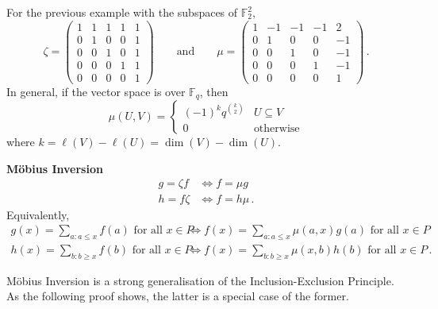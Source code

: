 \documentclass[a4paper]{article}
\newcommand{\example} {\bigskip\noindent{\bf Example.}\;\;}
\newenvironment{thm}[1]{
	\begin{framed}
	\noindent
	{\bfseries #1}\\}{\setlength{\itemsep}{0pt}
	\end{framed}
}
\newcommand{\FF}{\mathbb{F}}
\begin{document}
\newpage
\example
For the previous example with the subspaces of $\FF_2^2$,
	\[
      \zeta = \begin{pmatrix}
		1&1&1&1&1\\0&1&0&0&1\\0&0&1&0&1\\0&0&0&1&1\\0&0&0&0&1
	\end{pmatrix}\qquad\text{and}\qquad
      \mu = \begin{pmatrix}
		1&-1&-1&-1&2\\0&1&0&0&-1\\0&0&1&0&-1\\0&0&0&1&-1\\0&0&0&0&1
	\end{pmatrix}\,.\]
In general, if the vector space is over $\FF_q$, then
	\[ \mu(U,V) = \begin{cases}
		(-1)^k q^{\binom{k}{2}} & U \subseteq V\\
		0  & \text{otherwise}
	\end{cases}\]
where $k = \ell(V) - \ell(U) = \dim(V) - \dim(U)$.


\begin{thm}{M\"obius Inversion}
\begin{align*}
	g = \zeta f & \iff f = \mu g\\
	h = f\zeta  & \iff f = h\mu\,.
\end{align*}
Equivalently,
\begin{align*}
	g(x) = \sum_{a : a \leq x} f(a) \text{ for all } x \in P & \iff f(x)
         = \sum_{a : a \leq x} \mu (a,x) g(a) \text{ for all } x \in P\\
	h(x) = \sum_{b : b \geq x} f(b) \text{ for all } x \in P & \iff f(x)
         = \sum_{b : b \geq x} \mu (x,b) h(b) \text{ for all } x \in P\,.
\end{align*}
\end{thm}


M\"obius Inversion is a strong generalisation of the Inclusion-Exclusion Principle.\\
As the following proof shows, the latter is a special case of the former.
\end{document}
